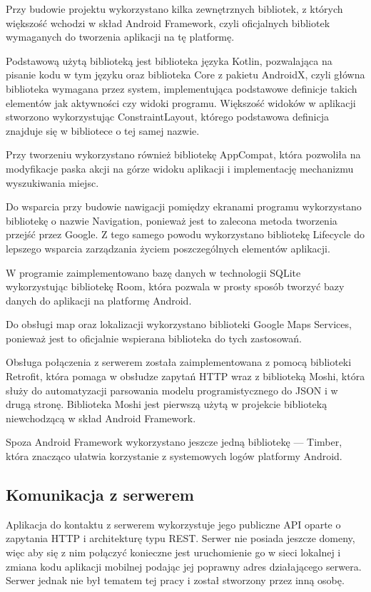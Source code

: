 \documentclass[polish,polish,a4paper,12pt]{article}
\begin{document}
	Przy budowie projektu wykorzystano kilka zewnętrznych bibliotek, z których większość wchodzi w skład Android Framework, czyli oficjalnych bibliotek wymaganych do tworzenia aplikacji na tę platformę.

	Podstawową użytą biblioteką jest biblioteka języka Kotlin, pozwalająca na pisanie kodu w tym języku oraz biblioteka Core z pakietu AndroidX, czyli główna biblioteka wymagana przez system, implementująca podstawowe definicje takich elementów jak aktywności czy widoki programu. Większość widoków w aplikacji stworzono wykorzystując ConstraintLayout, którego podstawowa definicja znajduje się w bibliotece o tej samej nazwie.

	Przy tworzeniu wykorzystano również bibliotekę AppCompat, która pozwoliła na modyfikacje paska akcji na górze widoku aplikacji i implementację mechanizmu wyszukiwania miejsc.

	Do wsparcia przy budowie nawigacji pomiędzy ekranami programu wykorzystano bibliotekę o nazwie Navigation, ponieważ jest to zalecona metoda tworzenia przejść przez Google. Z tego samego powodu wykorzystano bibliotekę Lifecycle do lepszego wsparcia zarządzania życiem poszczególnych elementów aplikacji.

	W programie zaimplementowano bazę danych w technologii SQLite wykorzystując bibliotekę Room, która pozwala w prosty sposób tworzyć bazy danych do aplikacji na platformę Android.

	Do obsługi map oraz lokalizacji wykorzystano biblioteki Google Maps Services, ponieważ jest to oficjalnie wspierana biblioteka do tych zastosowań.

	Obsługa połączenia z serwerem została zaimplementowana z pomocą biblioteki Retrofit, która pomaga w obsłudze zapytań HTTP wraz z biblioteką Moshi, która służy do automatyzacji parsowania modelu programistycznego do JSON i w drugą stronę. Biblioteka Moshi jest pierwszą użytą w projekcie biblioteką niewchodzącą w skład Android Framework.

	Spoza Android Framework wykorzystano jeszcze jedną bibliotekę — Timber, która znacząco ułatwia korzystanie z systemowych logów platformy Android.

	\subsection{Komunikacja z serwerem}

	Aplikacja do kontaktu z serwerem wykorzystuje jego publiczne API oparte o zapytania HTTP i architekturę typu REST. Serwer nie posiada jeszcze domeny, więc aby się z nim połączyć konieczne jest uruchomienie go w sieci lokalnej i zmiana kodu aplikacji mobilnej podając jej poprawny adres działającego serwera. Serwer jednak nie był tematem tej pracy i został stworzony przez inną osobę.
\end{document}
